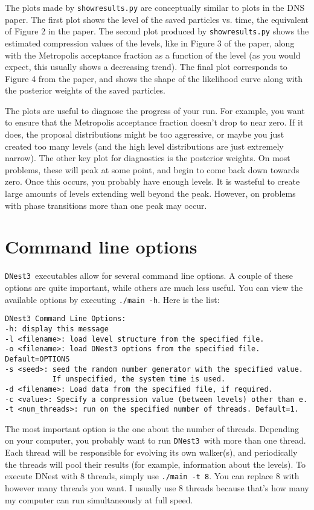 \documentclass[a4paper, 11pt]{article}
\newcommand{\dnest}{{\tt DNest3}}
\begin{document}
The plots made by {\tt showresults.py} are conceptually similar to plots in
the DNS paper. The first plot shows the level of the saved particles vs.
time, the equivalent of Figure 2 in the paper. The second plot produced by
{\tt showresults.py} shows the estimated compression values of the levels,
like in Figure 3 of the paper, along with the Metropolis acceptance fraction
as a function of the level (as you would expect, this usually shows a
decreasing trend). The final plot corresponds to Figure 4 from the paper, and
shows the shape of the likelihood curve along with the posterior weights of
the saved particles.

The plots are useful to diagnose the progress of your run. For example, you
want to ensure that the Metropolis acceptance fraction doesn't drop to near
zero. If it does, the proposal distributions might be too aggressive, or maybe
you just created too many levels (and the high level distributions are just
extremely narrow). The other key plot for diagnostics is the posterior
weights. On most problems, these will peak at some point, and begin to
come back down towards zero. Once this occurs, you probably have enough levels.
It is wasteful to create large amounts of levels extending well beyond the peak.
However, on problems with phase transitions more than one peak may occur.

\section{Command line options}
\dnest~executables allow for several command line options. A couple of these
options are quite important, while others are much less useful.
You can view the available options by executing
{\tt ./main -h}. Here is the list:

\begin{verbatim}
DNest3 Command Line Options:
-h: display this message
-l <filename>: load level structure from the specified file.
-o <filename>: load DNest3 options from the specified file. Default=OPTIONS
-s <seed>: seed the random number generator with the specified value.
           If unspecified, the system time is used.
-d <filename>: Load data from the specified file, if required.
-c <value>: Specify a compression value (between levels) other than e.
-t <num_threads>: run on the specified number of threads. Default=1.
\end{verbatim}
The most important option is the one about the number of threads. Depending on
your computer, you probably want to run \dnest~with more than one thread.
Each thread will be responsible for evolving its own walker(s), and periodically
the threads will pool their results (for example, information about the
levels). To execute DNest with 8 threads, simply use {\tt ./main -t 8}. You can
replace 8 with however many threads you want. I usually use 8 threads because
that's how many my computer can run simultaneously at full speed.
\end{document}
